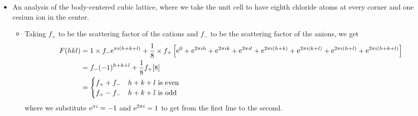 \documentclass[../notes.tex]{subfiles}
\begin{document}
\begin{itemize}
\begin{itemize}
    \end{itemize}
    \item An analysis of the  body-centered cubic lattice, where we take the unit cell to have eighth chloride atoms at every corner and one cesium ion in the center.
    \begin{itemize}
        \item Taking $f_+$ to be the scattering factor of the  cations and $f_-$ to be the scattering factor of the  anions, we get
        \begin{align*}
            F(hkl) &= 1\times f_-\e[\pi i(h+k+l)]+\frac{1}{8}\times f_+\left[ \e[0]+\e[2\pi ih]+\e[2\pi ik]+\e[2\pi il]+\e[2\pi i(h+k)]+\e[2\pi i(k+l)]+\e[2\pi i(h+l)]+\e[2\pi i(h+k+l)] \right]\\
            &= f_-(-1)^{h+k+l}+\frac{1}{8}f_+[8]\\
            &=
            \begin{cases}
                f_++f_- & h+k+l\text{ is even}\\
                f_+-f_- & h+k+l\text{ is odd}
            \end{cases}
        \end{align*}
        where we substitute $\e[\pi i]=-1$ and $\e[2\pi i]=1$ to get from the first line to the second.
    \end{itemize}
\end{itemize}
\end{document}
